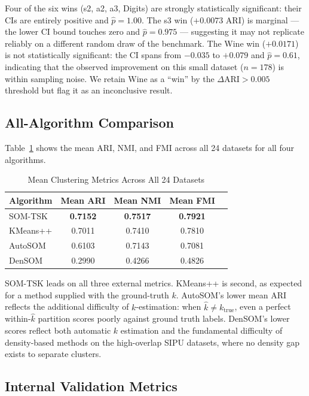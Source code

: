 \documentclass[journal]{IEEEtran}
\begin{document}
Four of the six wins (s2, a2, a3, Digits) are strongly statistically significant: their CIs are entirely positive and $\hat{p}=1.00$. The s3 win ($+0.0073$ ARI) is marginal — the lower CI bound touches zero and $\hat{p}=0.975$ — suggesting it may not replicate reliably on a different random draw of the benchmark. The Wine win ($+0.0171$) is not statistically significant: the CI spans from $-0.035$ to $+0.079$ and $\hat{p}=0.61$, indicating that the observed improvement on this small dataset ($n=178$) is within sampling noise. We retain Wine as a ``win'' by the $\Delta\mathrm{ARI}>0.005$ threshold but flag it as an inconclusive result.

\subsection{All-Algorithm Comparison}

Table~\ref{tab:all_algo} shows the mean ARI, NMI, and FMI across all 24 datasets for all four algorithms.

\begin{table}[!t]
\caption{Mean Clustering Metrics Across All 24 Datasets}
\label{tab:all_algo}
\centering
\renewcommand{\arraystretch}{1.05}
\begin{tabular}{lcccc}
\toprule
Algorithm & Mean ARI & Mean NMI & Mean FMI \\
\midrule
SOM-TSK & \textbf{0.7152} & \textbf{0.7517} & \textbf{0.7921} \\
KMeans++ & 0.7011 & 0.7410 & 0.7810 \\
AutoSOM & 0.6103 & 0.7143 & 0.7081 \\
DenSOM & 0.2990 & 0.4266 & 0.4826 \\
\bottomrule
\end{tabular}
\end{table}

SOM-TSK leads on all three external metrics. KMeans++ is second, as expected for a method supplied with the ground-truth $k$. AutoSOM's lower mean ARI reflects the additional difficulty of $k$-estimation: when $\hat{k} \ne k_{\text{true}}$, even a perfect within-$\hat{k}$ partition scores poorly against ground truth labels. DenSOM's lower scores reflect both automatic $k$ estimation and the fundamental difficulty of density-based methods on the high-overlap SIPU datasets, where no density gap exists to separate clusters.

\subsection{Internal Validation Metrics}
\end{document}
